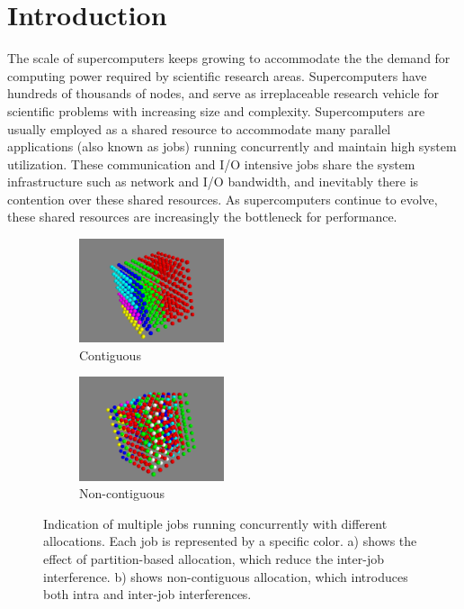 \documentclass[conference]{IEEEtran}
\begin{document}
\IEEEpeerreviewmaketitle


\section{Introduction} 
\label{sec: intro}

The scale of supercomputers keeps growing to accommodate the the demand for computing power required by scientific research areas. Supercomputers have hundreds of thousands of nodes, and serve as irreplaceable research vehicle for scientific problems with increasing size and complexity. Supercomputers are usually employed as a shared resource to accommodate many parallel applications (also known as jobs) running concurrently \cite{zhou-ipdps} and maintain high system utilization. These communication and I/O intensive jobs share the system infrastructure such as network and I/O bandwidth, and inevitably there is contention over these shared resources. As supercomputers continue to evolve, these shared resources are increasingly the bottleneck for performance.


\begin{figure}[h!]
    \centering
    \begin{subfigure}[t]{0.2\textwidth}
        \centering
        \includegraphics[height=1.2in]{figs/goodallocation}
        \caption{Contiguous}
        \label{fig:overview_sub1}
    \end{subfigure}%
    \hspace{1em}%
    \begin{subfigure}[t]{0.2\textwidth}
        \centering
        \includegraphics[height=1.2in]{figs/badallocation}
        \caption{Non-contiguous}
        \label{fig:overview_sub2}
    \end{subfigure}%
   \caption{Indication of multiple jobs running concurrently with different allocations. Each job is represented by a specific color. a) shows the effect of partition-based allocation, which reduce the inter-job interference. b) shows non-contiguous allocation, which introduces both intra and inter-job interferences. }
   \label{fig: overview}
\end{figure}
\end{document}
